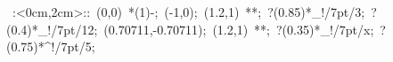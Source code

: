 %


\hbox{
\xy    <2cm,0cm>:<0cm,2cm>::
       (0,0) *\ellipse(1){-}; 
       (-1,0); (1.2,1) **\dir{-}; ?(0.85)*_!/7pt/{3};  ?(0.4)*_!/7pt/{12};
       (0.70711,-0.70711); (1.2,1) **\dir{-}; ?(0.35)*_!/7pt/{x}; ?(0.75)*^!/7pt/{5};
\endxy}

